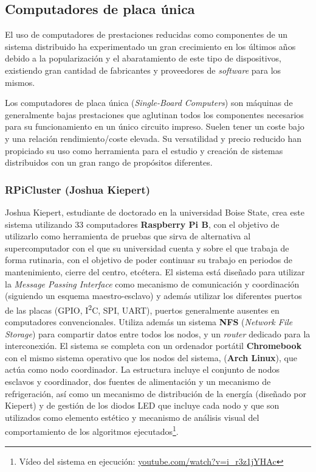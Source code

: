 \subsection{Computadores de placa única}

El uso de computadores de prestaciones reducidas como componentes de un sistema distribuido ha experimentado un gran crecimiento en los últimos años debido a la popularización y el abaratamiento de este tipo de dispositivos, existiendo gran cantidad de fabricantes y proveedores de \textit{software} para los mismos.

Los computadores de placa única (\textit{Single-Board Computers}) son máquinas de generalmente bajas prestaciones que aglutinan todos los componentes necesarios para su funcionamiento en un único circuito impreso. Suelen tener un coste bajo y una relación rendimiento/coste elevada. Su versatilidad y precio reducido han propiciado su uso como herramienta para el estudio y creación de sistemas distribuidos con un gran rango de propósitos diferentes.

\subsubsection{RPiCluster (Joshua Kiepert)}

Joshua Kiepert, estudiante de doctorado en la universidad Boise State, crea este sistema utilizando 33 computadores \textbf{Raspberry Pi B}, con el objetivo de utilizarlo como herramienta de pruebas que sirva de alternativa al supercomputador con el que su universidad cuenta\cite{joshuarpicluster} y sobre el que trabaja de forma rutinaria, con el objetivo de poder continuar su trabajo en periodos de mantenimiento, cierre del centro, etcétera. El sistema está diseñado para utilizar la \textit{Message Passing Interface} como mecanismo de comunicación y coordinación (siguiendo un esquema maestro-esclavo) y además utilizar los diferentes puertos de las placas (GPIO, I\textsuperscript{2}C, SPI, UART), puertos generalmente ausentes en computadores convencionales. Utiliza además un sistema \textbf{NFS} (\textit{Network File Storage}) para compartir datos entre todos los nodos, y un \textit{router} dedicado para la interconexión. El sistema se completa con un ordenador portátil \textbf{Chromebook} con el mismo sistema operativo que los nodos del sistema, (\textbf{Arch Linux}), que actúa como nodo coordinador. La estructura incluye el conjunto de nodos esclavos y coordinador, dos fuentes de alimentación y un mecanismo de refrigeración, así como un mecanismo de distribución de la energía (diseñado por Kiepert) y de gestión de los diodos LED que incluye cada nodo y que son utilizados como elemento estético y mecanismo de análisis visual del comportamiento de los algoritmos ejecutados\footnote{Vídeo del sistema en ejecución: \href{https://www.youtube.com/watch?v=i_r3z1jYHAc}{youtube.com/watch?v=i\_r3z1jYHAc}}.

